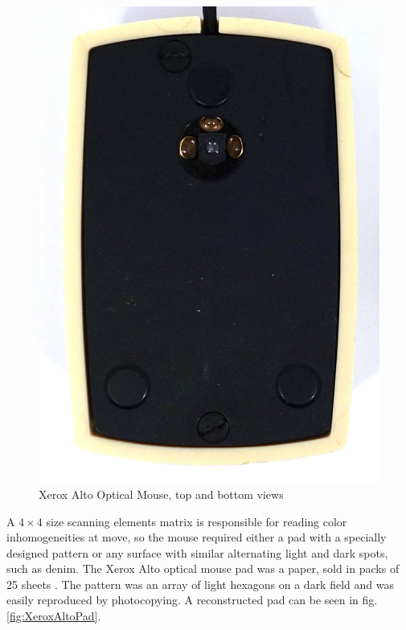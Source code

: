 \documentclass[11pt, a4paper]{article}
\begin{document}
\begin{figure}[h]
    \includegraphics[scale=0.5]{1981_xerox_alto_mouse/bottom_30.jpg}
    \caption{Xerox Alto Optical Mouse, top and bottom views}
    \label{XeroxAltoTopAndBottom}
\end{figure}

A $4 \times 4$ size scanning elements matrix is responsible for reading color inhomogeneities at move, so the mouse required either a pad with a specially designed pattern or any surface with similar alternating light and dark spots, such as denim. The Xerox Alto optical mouse pad was a paper, sold in packs of 25 sheets \cite{pad}. The pattern was an array of light hexagons on a dark field and was easily reproduced by photocopying. A reconstructed pad can be seen in fig. \ref{fig:XeroxAltoPad}.
\end{document}
